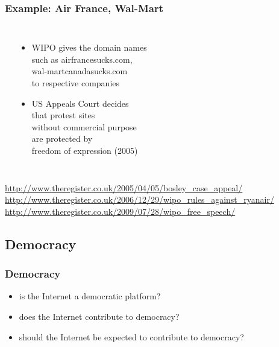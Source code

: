 \documentclass[dvipsnames]{beamer}
\theoremstyle{plain}
\begin{document}
\begin{frame}
  \frametitle{Example: Air France, Wal-Mart}

  \begin{columns}
    \begin{center}
    \end{center}

    \begin{itemize}
      \item WIPO gives the domain names\\
        such as airfrancesucks.com,\\
        wal-martcanadasucks.com\\
        to respective companies
      \item US Appeals Court decides\\
        that protest sites\\
        without commercial purpose\\
        are protected by\\
        freedom of expression (2005)
    \end{itemize}
  \end{columns}

  \medskip
  \tiny{\url{http://www.theregister.co.uk/2005/04/05/bosley_case_appeal/}}\\
  \tiny{\url{http://www.theregister.co.uk/2006/12/29/wipo_rules_against_ryanair/}}\\
  \tiny{\url{http://www.theregister.co.uk/2009/07/28/wipo_free_speech/}}\\
\end{frame}

\subsection{Democracy}

\begin{frame}
  \frametitle{Democracy}

  \begin{itemize}
    \item is the Internet a democratic platform?
    \item does the Internet contribute to democracy?
    \item should the Internet be expected to contribute to democracy?
  \end{itemize}
\end{frame}
\end{document}
